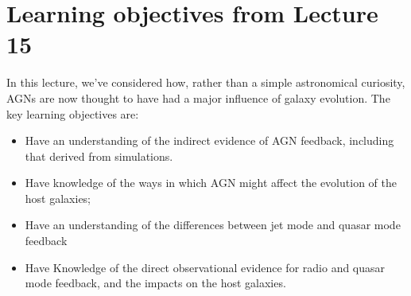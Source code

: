 \documentclass[11pt]{article}
\begin{document}
\section{Learning objectives from Lecture 15}
In this lecture, we've considered how, rather than a simple
astronomical curiosity, AGNs are now thought to have had a major
influence of galaxy evolution. The key learning objectives are:
\begin{itemize}
  \item Have an understanding of the indirect evidence of AGN
    feedback, including that derived from simulations.

\item Have knowledge of the ways in which AGN might affect the evolution of
  the host galaxies;

\item Have an understanding of the differences between jet mode and quasar
  mode feedback

\item Have Knowledge of the direct observational evidence for radio
  and quasar mode feedback, and the impacts on the host galaxies.

\end{itemize}
\end{document}

